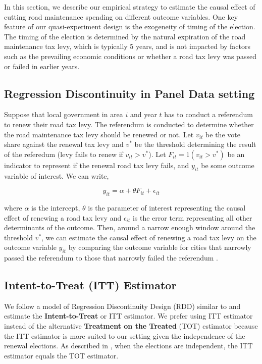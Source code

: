 In this section, we describe our empirical strategy to estimate the causal effect of cutting road maintenance spending on different outcome variables. One key feature of our quasi-experiment design is the exogeneity of timing of the election. The timing of the election is determined by the natural expiration of the road maintenance tax levy, which is typically 5 years, and is not impacted by factors such as the prevailing economic conditions or whether a road tax levy was passed or failed in earlier years.

\subsection{Regression Discontinuity in Panel Data setting}

Suppose that local government in area $i$ and year $t$ has to conduct a referendum to renew their road tax levy. The referendum is conducted to determine whether the road maintenance tax levy should be renewed or not. Let $v_{it}$ be the vote share against the renewal tax levy and  $v^*$ be the threshold determining the result of the referedum (levy fails to renew if $v_{it} > v^*$). Let $F_{it} = 1(v_{it} > v^*)$ be an indicator to represent if the renewal road tax levy fails, and $y_{it}$ be some outcome variable of interest. We can write,

$$
y_{it} = \alpha + \theta F_{it} + \epsilon_{it}
$$

where $\alpha$ is the intercept, $\theta$ is the parameter of interest representing the causal effect of renewing a road tax levy and $\epsilon_{it}$ is the error term representing all other determinants of the outcome. Then, around a narrow enough window around the threshold $v^*$, we can estimate the causal effect of renewing a road tax levy on the outcome variable $y_{it}$ by comparing the outcome variable for cities that narrowly passed the referendum to those that narrowly failed the referendum \cite{lee_lemieux2010}.

\subsection{Intent-to-Treat (ITT) Estimator}

We follow a model of Regression Discontinuity Design (RDD) similar to \cite{cellini2010value} and estimate the {\bf Intent-to-Treat} or ITT estimator. We prefer using ITT estimator instead of the alternative {\bf Treatment on the Treated} (TOT) estimator because the ITT estimator is more suited to our setting given the independence of the renewal elections. As described in \cite{cellini2010value}, when the elections are independent, the ITT estimator equals the TOT estimator.


